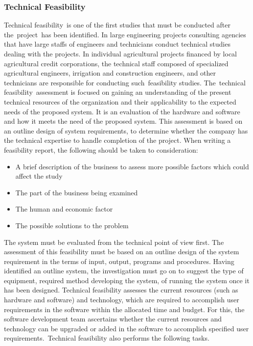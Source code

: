 \subsubsection{Technical Feasibility}
Technical feasibility is one of the first studies that must be conducted after the project has been identified. In large engineering projects consulting agencies that have large staffs of engineers and technicians conduct technical studies dealing with the projects. In individual agricultural projects financed by local agricultural credit corporations, the technical staff composed of specialized agricultural engineers, irrigation and construction engineers, and other technicians are responsible for conducting such feasibility studies. The technical feasibility assessment is focused on gaining an understanding of the present technical resources of the organization and their applicability to the expected needs of the proposed system. It is an evaluation of the hardware and software and how it meets the need of the proposed system. This assessment is based on an outline design of system requirements, to determine whether the company has the technical expertise to handle completion of the project. When writing a feasibility report, the following should be taken to consideration:
\begin{itemize}
	\item A brief description of the business to assess more possible factors which could affect the study
	\item The part of the business being examined
	\item The human and economic factor
	\item The possible solutions to the problem
\end{itemize}

The system must be evaluated from the technical point of view first. The assessment of this feasibility must be based on an outline design of the system requirement in the terms of input, output, programs and procedures. Having identified an outline system, the investigation must go on to suggest the type of equipment, required method developing the system, of running the system once it has been designed. Technical feasibility assesses the current resources (such as hardware and software) and technology, which are required to accomplish user requirements in the software within the allocated time and budget. For this, the software development team ascertains whether the current resources and technology can be upgraded or added in the software to accomplish specified user requirements. Technical feasibility also performs the following tasks.


